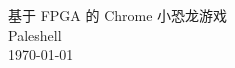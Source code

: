 \documentclass[hyperref,UTF8,12pt,a4paper]{ctexart}
\begin{document}
\begin{titlepage}
\begin{figure}[H]
\centering
\vspace{50pt}
\end{figure}
\begin{figure}[H]
\centering
\vspace{30pt}
\end{figure}
\begin{center}
\vspace{30pt}
\Large 基于 FPGA 的 Chrome 小恐龙游戏\\
\vspace{10pt}
\large Paleshell\\
\vspace{10pt}
\today
\end{center}
\end{titlepage}
\tableofcontents\newpage
\listoffigures\newpage
\listoftables\newpage
\end{document}
